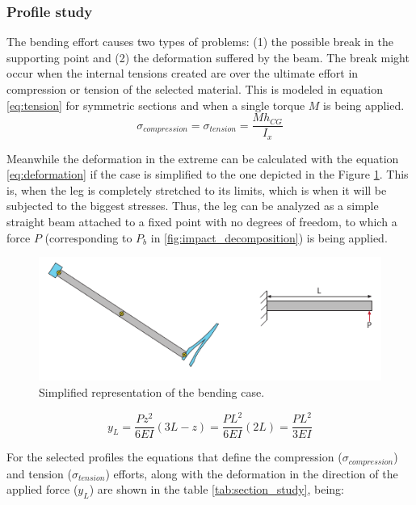 \subsubsection{Profile study} %
\label{ssub:profile_study}
  The bending effort causes two types of problems: (1) the possible break in the supporting point and (2) the deformation suffered by the beam.
  The break might occur when the internal tensions created are over the ultimate effort in compression or tension of the selected material.
  This is modeled in equation \ref{eq:tension} for symmetric sections and when a single torque $M$ is being applied.
  \begin{equation}
  \label{eq:tension}
    \sigma _{compression} = \sigma _{tension} = \frac{M h_{CG}}{I_x}
  \end{equation}

  Meanwhile the deformation in the extreme can be calculated with the equation \ref{eq:deformation} if the case is simplified to the one depicted in the Figure \ref{fig:bending_case}.
  This is, when the leg is completely stretched to its limits, which is when it will be subjected to the biggest stresses.
  Thus, the leg can be analyzed as a simple straight beam attached to a fixed point with no degrees of freedom, to which a force $P$ (corresponding to $P_{b}$ in \ref{fig:impact_decomposition}) is being applied.

  \begin{figure}[ht!]
    \centering
    \includegraphics[width=\textwidth]{figures/bending_case.pdf}
    \caption{Simplified representation of the bending case.}
    \label{fig:bending_case}
  \end{figure}

  \begin{equation}
  \label{eq:deformation}
    y_L = \frac{P z^2}{6EI}(3L-z) = \frac{P L^2}{6EI}(2L) = \frac{P L^2}{3EI}
  \end{equation}


  For the selected profiles the equations that define the compression ($\sigma _{compression}$) and tension ($\sigma _{tension}$) efforts, along with the deformation in the direction of the applied force ($y_L$) are shown in the table \ref{tab:section_study}, being:

